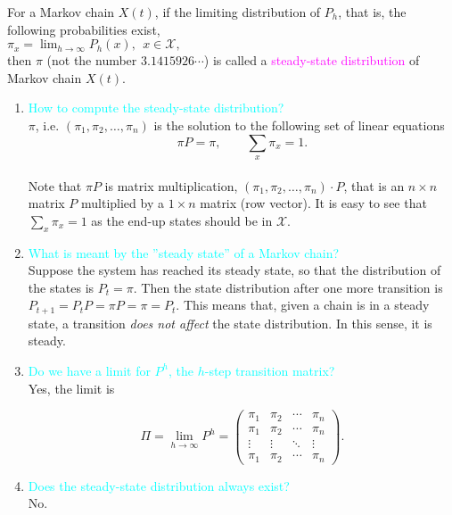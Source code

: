 \documentclass[20pt,landscape]{foils}
\newcommand{\no}{\noindent}
\begin{document}
\foilhead[-.8in]{\textcolor{blue}{Steady-state distribution}}
\no For a Markov chain $X(t)$, if the limiting distribution of $P_{h}$, that is,
the following probabilities exist, \\[.1in]
\hspace*{2in} $\pi_{x}=\lim_{h\to\infty}P_{h}(x),\ \ x\in\mathcal{X},$\\[.1in]
then \textbf{$\pi$ }(not the number $3.1415926\cdots$) is called
a \textcolor{magenta}{steady-state distribution} of Markov chain $X(t)$. 
\begin{enumerate}
\item {\textcolor{cyan}{How to compute the steady-state distribution?}} \\
$\pi$, i.e. $(\pi_{1},\pi_{2},\ldots,\pi_{n})$ is the solution
to the following set of linear equations 
$$\pi P=\pi,\qquad \sum_{x}\pi_{x}=1.$$\\
Note that $\pi P$ is matrix multiplication, $(\pi_{1},\pi_{2},\ldots,\pi_{n}) \cdot P$,
that is  an $n\times n$ matrix $P$ multiplied by a $1\times n$ matrix (row vector). 
It is easy to see that $\sum_{x}\pi_{x}=1$ as the end-up
states should be in $\mathcal{X}$.
 
\item {\textcolor{cyan}{What is meant by the ''steady state'' of a Markov chain?}}\\
Suppose the system has reached its steady state, so that the distribution
of the states is $P_{t}=\pi$. Then the state distribution after one
more transition is $P_{t+1}=P_{t}P=\pi P=\pi=P_{t}$. This means that,
given a chain is in a steady state, a transition \emph{does not affect} the state distribution.
In this sense, it is steady.\\
\vspace*{-.5in}

\item {\textcolor{cyan}{Do we have a limit for $P^{h}$, the $h$-step transition matrix?}}\\
Yes, the limit is\\
\vspace*{-.7in}

\[\Pi=\lim_{h\to\infty}P^h=\begin{pmatrix}\pi_1 & \pi_2 & \cdots &\pi_n\\
\pi_1 & \pi_2 & \cdots & \pi_n\\
\vdots & \vdots & \ddots & \vdots\\
\pi_1 & \pi_2 & \cdots & \pi_n
\end{pmatrix}.\]
\vspace*{-.4in}

\item {\textcolor{cyan}{Does the steady-state distribution always exist?}}\\
No.
\end{enumerate}
\end{document}
